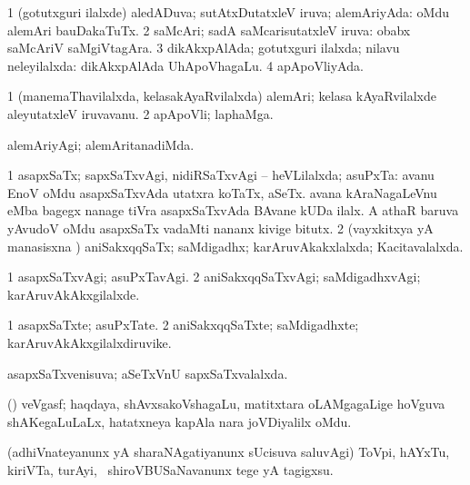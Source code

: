 \bentry
{} 
\gl{\gu}
\expl{}
\bmng
\bnum
\num{1} (gotutxguri ilalxde) aledADuva; sutAtxDutatxleV iruva; alemAriyAda:  oMdu alemAri bauDakaTuTx. 
\num{2} saMcAri; sadA saMcarisutatxleV iruva:  obabx saMcAriV saMgiVtagAra. 
\num{3} dikAkxpAlAda; gotutxguri ilalxda; nilavu neleyilalxda:  dikAkxpAlAda UhApoVhagaLu. 
\num{4} apApoVliyAda. 
\enum
\emng
\eentry

\bentry
{} 
\gl{\nA}
\expl{}
\bmng
\bnum
\num{1} (manemaThavilalxda, kelasakAyaRvilalxda) alemAri; kelasa kAyaRvilalxde aleyutatxleV iruvavanu. 
\num{2} apApoVli; laphaMga. 
\enum
\emng
\eentry

\bentry
{} 
\gl{\kirxvi}
\expl{}
\bmng
 alemAriyAgi; alemAritanadiMda. 
\emng
\eentry

\bentry
{} 
\gl{\gu}
\expl{}
\bmng
\bnum
\num{1} asapxSaTx; sapxSaTxvAgi, nidiRSaTxvAgi -- heVLilalxda; asuPxTa:  avanu EnoV oMdu asapxSaTxvAda utatxra koTaTx, aSeTx.  avana kAraNagaLeVnu eMba bagegx nanage tiVra asapxSaTxvAda BAvane kUDa ilalx.  A athaR baruva yAvudoV oMdu asapxSaTx vadaMti nananx kivige bitutx. 
\num{2} (vayxkitxya yA manasisxna \vi) aniSakxqqSaTx; saMdigadhx; karAruvAkakxlalxda; Kacitavalalxda. 
\enum
\emng
\eentry

\bentry
{} 
\gl{\kirxvi}
\expl{}
\bmng
\bnum
\num{1} asapxSaTxvAgi; asuPxTavAgi. 
\num{2} aniSakxqqSaTxvAgi; saMdigadhxvAgi; karAruvAkAkxgilalxde. 
\enum
\emng
\eentry

\bentry
{} 
\gl{\nA}
\expl{}
\bmng
\bnum
\num{1} asapxSaTxte; asuPxTate. 
\num{2} aniSakxqqSaTxte; saMdigadhxte; karAruvAkAkxgilalxdiruvike. 
\enum
\emng
\eentry

\bentry
{} 
\gl{\gu}
\expl{}
\bmng
 asapxSaTxvenisuva; aSeTxVnU sapxSaTxvalalxda. 
\emng
\eentry

\bentry
{} 
\gl{\nA}
\bmng
 (\aMrashA) veVgasf; haqdaya, shAvxsakoVshagaLu, matitxtara oLAMgagaLige hoVguva shAKegaLuLaLx, hatatxneya kapAla nara joVDiyalilx oMdu. 
\emng
\eentry

\bentry
{} 
\gl{\sakirx}
\expl{}
\bmng
 (adhiVnateyanunx yA sharaNAgatiyanunx sUcisuva saluvAgi) ToVpi, hAYxTu, kiriVTa, turAyi, \mo\ shiroVBUSaNavanunx tege yA tagigxsu. 
\emng

